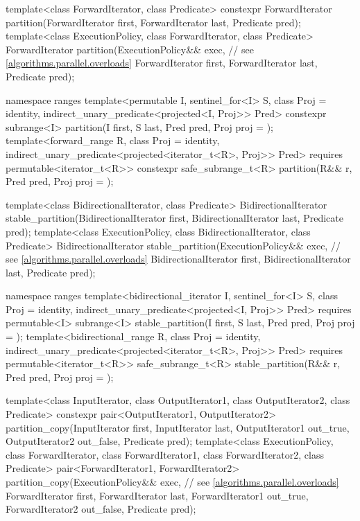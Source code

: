 \begin{codeblock}
{  template<class ForwardIterator, class Predicate>
    constexpr ForwardIterator partition(ForwardIterator first,
                                        ForwardIterator last,
                                        Predicate pred);
  template<class ExecutionPolicy, class ForwardIterator, class Predicate>
    ForwardIterator partition(ExecutionPolicy&& exec,           // see \ref{algorithms.parallel.overloads}
                              ForwardIterator first,
                              ForwardIterator last,
                              Predicate pred);

  namespace ranges {
    template<permutable I, sentinel_for<I> S, class Proj = identity,
             indirect_unary_predicate<projected<I, Proj>> Pred>
      constexpr subrange<I>
        partition(I first, S last, Pred pred, Proj proj = {});
    template<forward_range R, class Proj = identity,
             indirect_unary_predicate<projected<iterator_t<R>, Proj>> Pred>
      requires permutable<iterator_t<R>>
      constexpr safe_subrange_t<R>
        partition(R&& r, Pred pred, Proj proj = {});
  }

  template<class BidirectionalIterator, class Predicate>
    BidirectionalIterator stable_partition(BidirectionalIterator first,
                                           BidirectionalIterator last,
                                           Predicate pred);
  template<class ExecutionPolicy, class BidirectionalIterator, class Predicate>
    BidirectionalIterator stable_partition(ExecutionPolicy&& exec,  // see \ref{algorithms.parallel.overloads}
                                           BidirectionalIterator first,
                                           BidirectionalIterator last,
                                           Predicate pred);

  namespace ranges {
    template<bidirectional_iterator I, sentinel_for<I> S, class Proj = identity,
             indirect_unary_predicate<projected<I, Proj>> Pred>
      requires permutable<I>
      subrange<I> stable_partition(I first, S last, Pred pred, Proj proj = {});
    template<bidirectional_range R, class Proj = identity,
             indirect_unary_predicate<projected<iterator_t<R>, Proj>> Pred>
      requires permutable<iterator_t<R>>
      safe_subrange_t<R> stable_partition(R&& r, Pred pred, Proj proj = {});
  }

  template<class InputIterator, class OutputIterator1,
           class OutputIterator2, class Predicate>
    constexpr pair<OutputIterator1, OutputIterator2>
      partition_copy(InputIterator first, InputIterator last,
                     OutputIterator1 out_true, OutputIterator2 out_false,
                     Predicate pred);
  template<class ExecutionPolicy, class ForwardIterator, class ForwardIterator1,
           class ForwardIterator2, class Predicate>
    pair<ForwardIterator1, ForwardIterator2>
      partition_copy(ExecutionPolicy&& exec,                    // see \ref{algorithms.parallel.overloads}
                     ForwardIterator first, ForwardIterator last,
                     ForwardIterator1 out_true, ForwardIterator2 out_false,
                     Predicate pred);

}
\end{codeblock}
